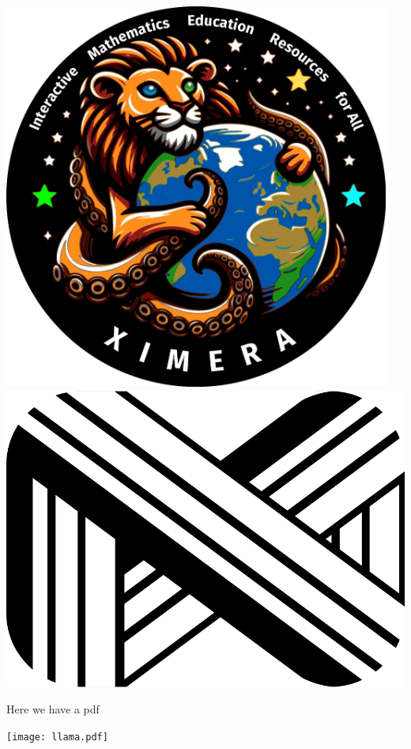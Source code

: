 \documentclass{ximera}
\begin{document}
\begin{center}
  \includegraphics[width=5in]{missionPatch.jpg}\qquad
  \includegraphics[width=5in\textwidth]{mx.png}
\end{center}
Here we have a pdf
\begin{image}
  \texttt{[image: llama.pdf]}
\end{image}
\end{document}
